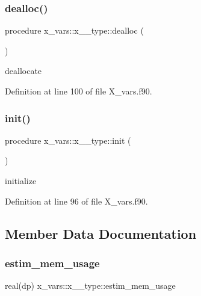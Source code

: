 \subsubsection{\texorpdfstring{dealloc()}{dealloc()}}
{\footnotesize\ttfamily procedure x\+\_\+vars\+::x\+\_\+\_\+type\+::dealloc (\begin{DoxyParamCaption}{ }\end{DoxyParamCaption})}



deallocate 



Definition at line 100 of file X\+\_\+vars.\+f90.

\mbox{\label{structx__vars_1_1x__2__type_ac3a132afc759fb6a00e53240fba9266e}} 
\subsubsection{\texorpdfstring{init()}{init()}}
{\footnotesize\ttfamily procedure x\+\_\+vars\+::x\+\_\+\_\+type\+::init (\begin{DoxyParamCaption}{ }\end{DoxyParamCaption})}



initialize 



Definition at line 96 of file X\+\_\+vars.\+f90.



\subsection{Member Data Documentation}
\mbox{\label{structx__vars_1_1x__2__type_ada4dee48cd358adb447688c11170d3b4}} 
\subsubsection{\texorpdfstring{estim\+\_\+mem\+\_\+usage}{estim\_mem\_usage}}
{\footnotesize\ttfamily real(dp) x\+\_\+vars\+::x\+\_\+\_\+type\+::estim\+\_\+mem\+\_\+usage}



